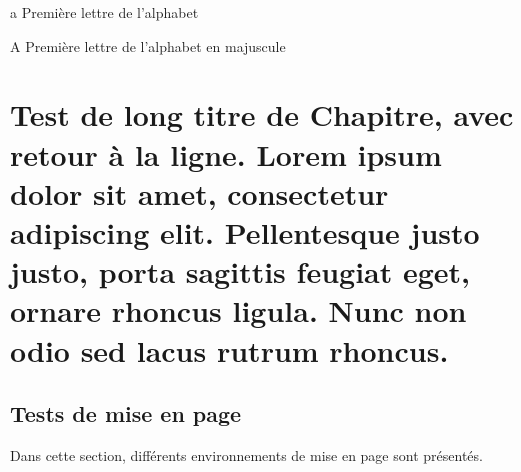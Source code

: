 \documentclass[a4paper, oneside, 12pt, memoireMaitrise, francais, creativecommons, hyperref]{memoESPA}
\begin{document}
\begin{listofsymbols}[3cm]
\item [a] Première lettre de l'alphabet
\item [A] Première lettre de l'alphabet en majuscule
\end{listofsymbols}


\cleardoublepage


\reversemarginpar


\begin{introduction}

\lipsum[1-3] %

\end{introduction}

\chapter{Test de long titre de Chapitre, avec retour à la ligne. Lorem ipsum dolor sit amet, consectetur adipiscing elit. Pellentesque justo justo, porta sagittis feugiat eget, ornare rhoncus ligula. Nunc non odio sed lacus rutrum rhoncus.}


\section{Tests de mise en page}

Dans cette section, différents environnements de mise en page sont présentés.
\end{document}
